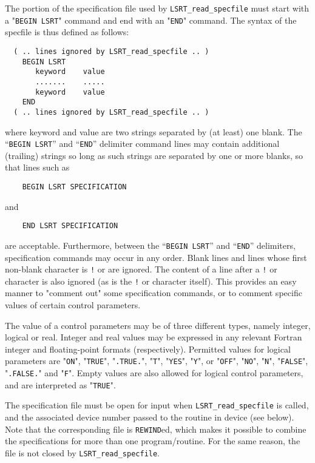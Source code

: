 \documentclass{galahad}
\newcommand{\packagename}{LS\-RT}
\begin{document}
The portion of the specification file used by 
{\tt \packagename\_read\_specfile}
must start
with a "{\tt BEGIN \packagename}" command and end with an 
"{\tt END}" command.  The syntax of the specfile is thus defined as follows:
\begin{verbatim}
  ( .. lines ignored by LSRT_read_specfile .. )
    BEGIN LSRT
       keyword    value
       .......    .....
       keyword    value
    END 
  ( .. lines ignored by LSRT_read_specfile .. )
\end{verbatim}
where keyword and value are two strings separated by (at least) one blank.
The ``{\tt BEGIN \packagename}'' and ``{\tt END}'' delimiter command lines 
may contain additional (trailing) strings so long as such strings are 
separated by one or more blanks, so that lines such as
\begin{verbatim}
    BEGIN LSRT SPECIFICATION
\end{verbatim}
and
\begin{verbatim}
    END LSRT SPECIFICATION
\end{verbatim}
are acceptable. Furthermore, 
between the
``{\tt BEGIN \packagename}'' and ``{\tt END}'' delimiters,
specification commands may occur in any order.  Blank lines and
lines whose first non-blank character is {\tt !} or {\tt *} are ignored. 
The content 
of a line after a {\tt !} or {\tt *} character is also 
ignored (as is the {\tt !} or {\tt *}
character itself). This provides an easy manner to "comment out" some 
specification commands, or to comment specific values 
of certain control parameters.  

The value of a control parameters may be of three different types, namely
integer, logical or real.
Integer and real values may be expressed in any relevant Fortran integer and
floating-point formats (respectively). Permitted values for logical
parameters are "{\tt ON}", "{\tt TRUE}", "{\tt .TRUE.}", "{\tt T}", 
"{\tt YES}", "{\tt Y}", or "{\tt OFF}", "{\tt NO}",
"{\tt N}", "{\tt FALSE}", "{\tt .FALSE.}" and "{\tt F}". 
Empty values are also allowed for 
logical control parameters, and are interpreted as "{\tt TRUE}".  

The specification file must be open for 
input when {\tt \packagename\_read\_specfile}
is called, and the associated device number 
passed to the routine in device (see below). 
Note that the corresponding 
file is {\tt REWIND}ed, which makes it possible to combine the specifications 
for more than one program/routine.  For the same reason, the file is not
closed by {\tt \packagename\_read\_specfile}.
\end{document}
